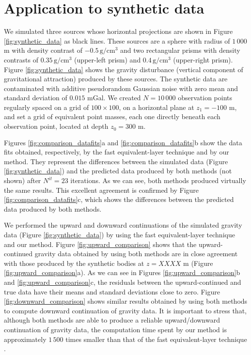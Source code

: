 \section{Application to synthetic data}

We simulated three sources whose horizontal projections are shown in Figure \ref{fig:synthetic_data} as black lines. 
These sources are a sphere with radius of $1\,000$ m with density contrast of 
$-0.5\, \mathrm{g/cm^3}$ and two rectangular prisms with density contrasts of $0.35\, \mathrm{g/cm^3}$ (upper-left prism) 
and $0.4\, \mathrm{g/cm^3}$ (upper-right prism). 
Figure \ref{fig:synthetic_data} shows the gravity disturbance (vertical component of gravitational attraction) 
produced by these sources. The synthetic data are contaminated with additive pseudorandom Gaussian 
noise with zero mean and standard deviation of $0.015$ mGal.
We created $N = 10\,000$ observation points regularly spaced on a grid of $100 \times 100$, on a 
horizontal plane at $z_{1} = -100$ m, and set a grid of equivalent point masses, each one directly beneath each 
observation point, located at depth $z_{0} = 300$ m. 

Figures \ref{fig:comparison_datafits}a and \ref{fig:comparison_datafits}b show the data fits 
obtained, respectively, by the fast equivalent-layer technique \citep{siqueira-etal2017} 
and by our method. They represent the differences between the simulated data (Figure \ref{fig:synthetic_data}) and the predicted data produced by both methods 
(not shown) after $N^{it} = 23$ iterations. 
As we can see, both methods produced virtually the same results.
This excellent agreement is confirmed by Figure \ref{fig:comparison_datafits}c, which shows 
the differences between the predicted data produced by both methods.

We performed the upward and downward continuations of the simulated gravity data 
(Figure \ref{fig:synthetic_data}) by using the fast equivalent-layer technique 
and our method.
Figure \ref{fig:upward_comparison} shows that the upward-continued gravity data obtained 
by using both methods are in close agreement with those produced by the synthetic 
bodies at $z = XXXX$ m (Figure \ref{fig:upward_comparison}a).
As we can see in Figures \ref{fig:upward_comparison}b and \ref{fig:upward_comparison}c,
the residuals between the upward-continued and true data have their means and standard 
deviations close to zero. 
Figure \ref{fig:downward_comparison} shows similar results obtained by using both 
methods to compute downward continuation of gravity data.
It is important to stress that, although both methods are able to produce a reliable 
upward/downward continuation of gravity data, the computation time spent by our method 
is approximately $1\,500$ times smaller than that of the fast equivalent-layer 
technique \citep{siqueira-etal2017}. 